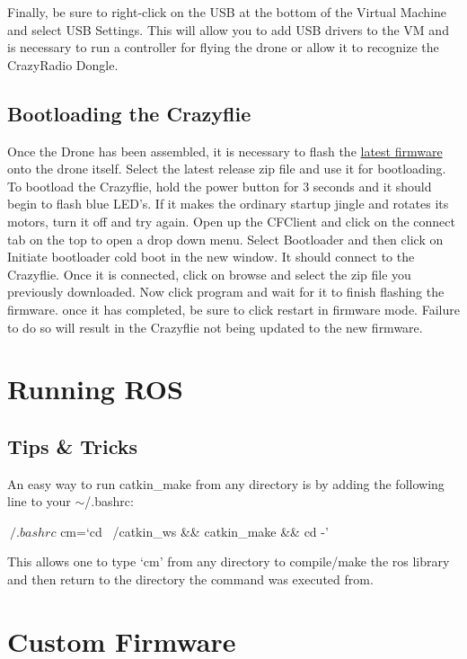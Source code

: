 \documentclass[]{article}
\begin{document}
\noindent Finally, be sure to right-click on the USB at the bottom of the Virtual Machine and select USB Settings. This will allow you to add USB drivers to the VM and is necessary to run a controller for flying the drone or allow it to recognize the CrazyRadio Dongle.

\subsection{Bootloading the Crazyflie}

\noindent Once the Drone has been assembled, it is necessary to flash the \href{https://github.com/bitcraze/crazyflie-release/releases}{latest
firmware} onto the drone itself. Select the latest release zip file and use it for bootloading. To bootload the Crazyflie, hold the power button for 3 seconds and it should begin to flash blue LED's. If it makes the ordinary startup jingle and rotates its motors, turn it off and try again. Open up the CFClient and click on the connect tab on the top to open a drop down menu. Select Bootloader and then click on Initiate bootloader cold boot in the new window. It should connect to the Crazyflie. Once it is connected, click on browse and select the zip file you previously downloaded. Now click program and wait for it to finish flashing the firmware. once it has completed, be sure to click restart in firmware mode. Failure to do so will result in the Crazyflie not being updated to the new firmware.

\section{Running ROS}

\subsection{Tips \& Tricks}

\noindent An easy way to run catkin\_make from any directory is by adding the following line to your $\sim$/.bashrc:

\begin{terminal}
$ ~/.bashrc
$ cm=`cd ~/catkin_ws && catkin_make && cd -'
\end{terminal}

This allows one to type `cm' from any directory to compile/make the ros library and then return to the directory the command was executed from.

\section{Custom Firmware}
\end{document}
